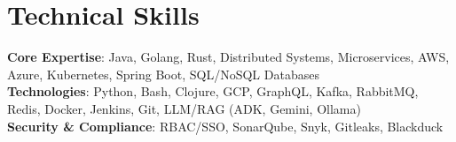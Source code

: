\documentclass[letterpaper,11pt]{article}
\begin{document}
\section{Technical Skills}
 \begin{itemize}[leftmargin=0.15in, label={}]
    \small{
        \item{
            \textbf{Core Expertise}{: Java, Golang, Rust, Distributed Systems, Microservices, AWS, Azure, Kubernetes, Spring Boot, SQL/NoSQL Databases} \\
            \textbf{Technologies}{: Python, Bash, Clojure, GCP, GraphQL, Kafka, RabbitMQ, Redis, Docker, Jenkins, Git, LLM/RAG (ADK, Gemini, Ollama)} \\
            \textbf{Security \& Compliance}{: RBAC/SSO, SonarQube, Snyk, Gitleaks, Blackduck} \\
        }
    }
 \end{itemize}


\end{document}
